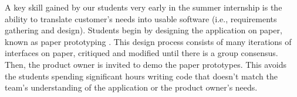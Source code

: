 



A key skill gained by our students very early in the summer internship is the ability to translate customer's needs into usable software (i.e., requirements gathering and design). Students begin by designing the application on paper, known as paper prototyping \cite{2003paperPrototype}. This design process consists of many iterations of interfaces on paper, critiqued and modified until there is a group consensus. Then, the product owner is invited to demo the paper prototypes. This avoids the students spending significant hours writing code that doesn't match the team's understanding of the application or the product owner's needs.


